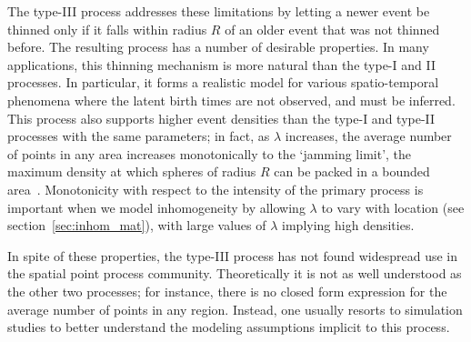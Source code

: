 \documentclass{statsoc}
\begin{document}
The \matern type-III process %
addresses these limitations by letting a newer event be thinned only if 
it falls within radius $R$ of 
an older event that was not thinned before. %
The resulting process has a number of desirable properties. In many applications, this thinning mechanism is 
more natural than the type-I and II processes. %
In particular, it forms a realistic model for various spatio-temporal phenomena where the latent birth times are not observed, and
must be inferred.  This process also supports higher event densities than the type-I and 
type-II processes with the same parameters; in fact, as $\lambda$ increases,
the average number of points in any area increases monotonically to %
the `jamming limit', the maximum density at which spheres of radius $R$ can be packed in a bounded area~\citep{moller10}. %
Monotonicity with respect to the intensity of the primary process is important when we model inhomogeneity by
allowing $\lambda$ to vary with location (see section~\ref{sec:inhom_mat}), with large values of $\lambda$ implying high densities.

In spite of these properties, the \matern type-III process has not found widespread use in the spatial point process community.
Theoretically it is not as well understood as the other two \matern processes; for instance, there is no closed form 
expression for the average number of points in any region. Instead, one usually resorts to simulation studies to better understand the modeling assumptions
implicit to this process.
\end{document}
